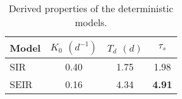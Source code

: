 \begin{table}[h]
\centering
\caption{Derived properties of the deterministic models.}
\label{tab:props}
\begin{tabular}{lccc}
\toprule
Model & $K_0$ $(d^{-1})$ & $T_d$ $(d)$ & $\tau_s$  \\
 \midrule
 SIR &               0.40 &              1.75 &      1.98  \\
 SEIR &              0.16 &              4.34 &      \textbf{4.91}  \\
\bottomrule
\end{tabular}
\end{table}
